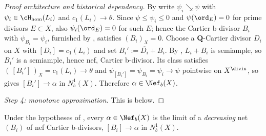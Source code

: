 \begin{proof}[Proof architecture and historical dependency]
By  write
$\psi_i\searrow\psi$ with $\psi_i\in\cH_{\mathrm{hom}}(L_i)$ and
$c_1(L_i)\to\theta$.  Since $\psi\leq\psi_i\leq0$ and
$\psi(\ord_E)=0$ for prime divisors $E\subset X$, also
$\psi_i(\ord_E)=0$ for such $E$; hence the Cartier b-divisor $B_i$
with $\psi_{B_i}=\psi_i$, furnished by
, satisfies $(B_i)_X=0$.  Choose a
$\mathbf Q$-Cartier divisor $D_i$ on $X$ with
$[D_i]=c_1(L_i)$ and set $B_i':=\overline{D_i}+B_i$.  By
, $L_i+B_i$ is semiample, so
$B_i'$ is a semiample, hence nef, Cartier b-divisor.  Its class satisfies
$(\,[B_i']\,)_X=c_1(L_i)\to\theta$ and
$\psi_{[B_i']}=\psi_{B_i}=\psi_i\to\psi$ pointwise on $X^{\divis}$, so
 gives $[B_i']\to\alpha$ in
$N^1_b(X)$.  Therefore $\alpha\in\Nef_b(X)$.

\medskip
\noindent\emph{Step 4: monotone approximation.}
This is  below.
\end{proof}

\begin{corollary}
\label{cor:ch35-monotone-approximation}
Under the hypotheses of
, every
$\alpha\in\Nef_b(X)$ is the limit of a \emph{decreasing} net $(B_i)$ of
nef Cartier b-divisors, $[B_i]\to\alpha$ in $N^1_b(X)$.
\end{corollary}

